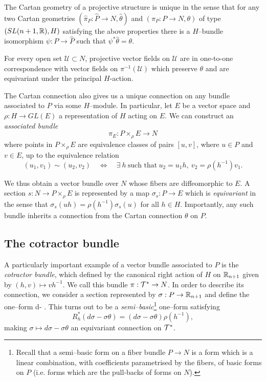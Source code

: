 \begin{rmk}The Cartan geometry of a projective structure is unique in the sense that for any two Cartan geometries $(\widehat{\pi}_P:\widehat{P}\rightarrow N,\widehat{\theta})$ and $(\pi_P:P\rightarrow N,\theta)$ of type $(SL(n+1,\mathbb{R}),H)$ satisfying the above properties there is a $H$--bundle isomorphism $\psi:P\rightarrow\widehat{P}$ such that $\psi^*\widehat{\theta}=\theta$. %
\end{rmk}

\begin{rmk} \label{rmk:theta_symmetry}
For every open set $\mathcal{U}\subset N$, projective vector fields on $\mathcal{U}$ are in one-to-one correspondence with vector fields on $\pi^{-1}(\mathcal{U})$
which preserve $\theta$ and are equivariant  under the principal $H$-action.
\end{rmk}


\begin{rmk}
The Cartan connection also gives us a unique connection on any bundle associated to $P$ via some $H$--module. In particular, let $E$ be a vector space and $\rho:H\rightarrow GL(E)$ a representation of $H$ acting on $E$. We can construct an \textit{associated bundle}
\[\pi_E:P\times_\rho E\rightarrow N \]
where points in $P\times_\rho E$ are equivalence classes of pairs $[u,v]$, where $u\in P$ and $v\in E$, up to the equivalence relation
\[
(u_1,v_1)\sim (u_2,v_2) \quad \Leftrightarrow \quad \exists\ h\ \mbox{such that}\  u_2=u_1 h,\  v_2 = \rho(h^{-1}) v_1.
\]

We thus obtain a vector bundle over $N$ whose fibers are diffeomorphic to $E$. A section $s:N\rightarrow P\times_\rho E$ is represented by a map $\sigma_s:P\rightarrow E$ which is \textit{equivariant} in the sense that $ \sigma_s(uh)=\rho(h^{-1})\sigma_s(u)$ for all $h\in H$. Importantly, any such bundle inherits a connection from the Cartan connection $\theta$ on $P$.
\end{rmk}


\subsection{The cotractor bundle}
A particularly important example of a vector bundle associated to $P$ is the \textit{cotractor bundle}, which defined by the canonical right action of $H$ on $\mathbb{R}_{n+1}$ given by $(h,v)\mapsto vh^{-1}$. We call this bundle $\pi:\mathcal{T}^*\rightarrow N$. In order to describe its connection, we consider a section represented by $\sigma:P\rightarrow\mathbb{R}_{n+1}$ and define the one--form
\be \label{eq:df-ftheta}
d\sigma - \sigma\theta.
\ee
This turns out to be a \textit{semi--basic}\footnote{Recall that a semi--basic form on a fiber bundle $P\rightarrow N$ is a form which is a linear combination, with coefficients parametrised by the fibers, of basic forms on $P$ (i.e. forms which are the pull-backs of forms on $N$).} one--form satisfying
\[
R_h^*(d\sigma-\sigma\theta) = (d\sigma - \sigma\theta)\rho(h^{-1}),
\]
making $\sigma\mapsto d\sigma-\sigma\theta$ an equivariant connection on $\mathcal{T}^*$.

